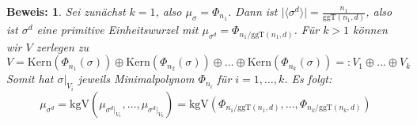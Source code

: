 \documentclass[12pt,a4paper,halfparskip,headsepline,bibtotocnumbered]{scrreprt}
\theoremstyle{nummermitklammern}
\theoremstyle{nonumberbreak}
\newtheorem{beweis}{Beweis:}
\newcommand{\Kern}{\text{Kern}}
\newcommand{\ggT}{\text{ggT}}
\newcommand{\kgV}{\text{kgV}}
\begin{document}
\begin{beweis}
	Sei zunächst $k=1$, also $\mu_\sigma = \Phi_{n_1}$. Dann ist $\vert \langle \sigma^d \rangle \vert = \frac{n_1}{\ggT(n_1,d)}$, also ist $\sigma^d$ eine primitive Einheitswurzel mit $\mu_{\sigma^d} = \Phi_{n_1/\ggT(n_1,d)}$.
	Für $k > 1$ können wir $V$ zerlegen zu 
	\begin{equation*}
		V = \Kern(\Phi_{n_1}(\sigma)) \oplus \Kern(\Phi_{n_2}(\sigma)) \oplus \dots \oplus \Kern(\Phi_{n_k}(\sigma)) =: V_1 \oplus \dots \oplus V_k
	\end{equation*}
	Somit hat $\sigma\vert_{V_i}$ jeweils Minimalpolynom $\Phi_{n_i}$ für $i=1,\dots, k$. Es folgt:
	\begin{equation*}
		\mu_{\sigma^d} = \kgV( \mu_{\sigma^d \vert_{V_1}}, \dots, \mu_{\sigma^d\vert_{V_k}}) = \kgV(\Phi_{n_1 / \ggT(n_1, d)}, \dots, \Phi_{n_k / \ggT(n_k,d)})
	\end{equation*}
\end{beweis}
\end{document}
